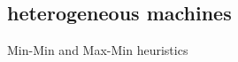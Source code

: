 \documentclass[10pt, conference, compsocconf]{IEEEtran}
\begin{document}
\subsection{heterogeneous machines}
Min-Min and Max-Min heuristics

{\tiny
\newcommand{\BIBdecl}{\setlength{\itemsep}{0.2 em}}


}

\end{document}
